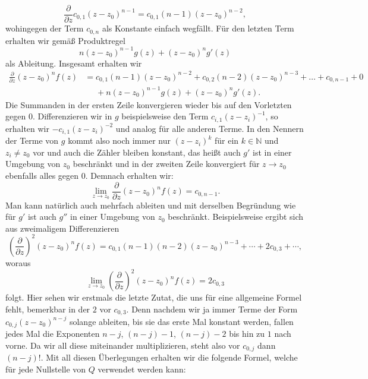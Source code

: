 \documentclass{article}
\theoremstyle{plain}
\theoremstyle{definition}
\begin{document}
\begin{enumerate}
	      \[
		      \frac{\partial}{\partial z} c_{0, 1}(z - z_0)^{n - 1} = c_{0, 1} (n - 1) (z - z_0)^{n - 2},
	      \]
	      wohingegen der Term $c_{0, n}$ als Konstante einfach wegfällt.
	      Für den letzten Term erhalten wir gemäß Produktregel
	      \[
		      n (z - z_0)^{n - 1} g(z) + (z - z_0)^{n} g'(z)
	      \]
	      als Ableitung.
	      Insgesamt erhalten wir
	      \begin{align*}
		      \frac{\partial}{\partial z} (z - z_0)^{n} f(z) & = c_{0, 1} (n - 1) (z - z_0)^{n - 2} + c_{0, 2} (n - 2) (z - z_0)^{n - 3} + \dots + c_{0, n - 1} + 0 \\
		                                                     & \phantom{=} + n (z - z_0)^{n - 1} g(z) + (z - z_0)^{n} g'(z).
	      \end{align*}
	      Die Summanden in der ersten Zeile konvergieren wieder bis auf den Vorletzten gegen $0$.
	      Differenzieren wir in $g$ beispielsweise den Term $c_{i, 1}(z - z_i)^{-1}$, so erhalten wir $-c_{i, 1}(z - z_i)^{-2}$ und analog für alle anderen Terme.
	      In den Nennern der Terme von $g$ kommt also noch immer nur $(z - z_i)^k$ für ein $k \in \mathbb{N}$ und $z_i \neq z_0$ vor und auch die Zähler bleiben konstant, das heißt auch $g'$ ist in einer Umgebung von $z_0$ beschränkt und in der zweiten Zeile konvergiert für $z \to z_0$ ebenfalls alles gegen $0$.
	      Demnach erhalten wir:
	      \[
		      \lim_{z \to z_0} \frac{\partial}{\partial z} (z - z_0)^{n} f(z) = c_{0, n-1}.
	      \]
	      Man kann natürlich auch mehrfach ableiten und mit derselben Begründung wie für $g'$ ist auch $g''$ in einer Umgebung von $z_0$ beschränkt.
	      Beispielsweise ergibt sich aus zweimaligem Differenzieren
	      \[
		      \left(\frac{\partial}{\partial z}\right)^2 (z - z_0)^{n} f(z) = c_{0, 1}(n - 1) (n - 2) (z - z_0)^{n - 3} + \cdots + 2 c_{0, 3} + \cdots,
	      \]
	      woraus
	      \[
		      \lim_{z \to z_0} \left(\frac{\partial}{\partial z}\right)^2 (z - z_0)^{n} f(z) = 2 c_{0, 3}
	      \]
	      folgt.
	      Hier sehen wir erstmals die letzte Zutat, die uns für eine allgemeine Formel fehlt, bemerkbar in der $2$ vor $c_{0, 3}$.
	      Denn nachdem wir ja immer Terme der Form $c_{0, j} (z - z_0)^{n - j}$ solange ableiten, bis sie das erste Mal konstant werden, \glqq fallen\grqq{} jedes Mal die Exponenten $n - j$, $(n - j) - 1$, $(n - j) - 2$ bis hin zu $1$ nach vorne.
	      Da wir all diese miteinander multiplizieren, steht also vor $c_{0, j}$ dann $(n - j)!$.
	      Mit all diesen Überlegungen erhalten wir die folgende Formel, welche für jede Nullstelle von $Q$ verwendet werden kann:

\end{enumerate}
\end{document}
